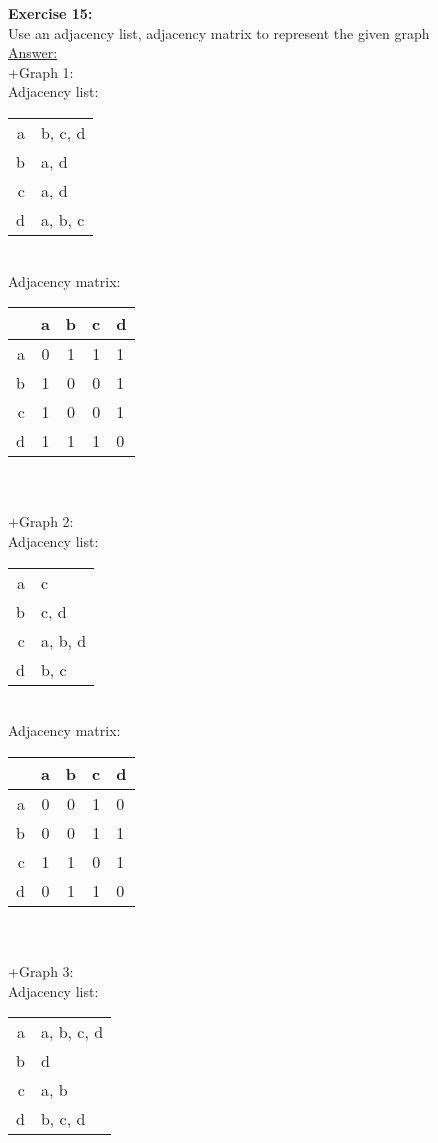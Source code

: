 \documentclass[10pt]{article}
\begin{document}
	\textbf{Exercise 15:}\\
Use an adjacency list, adjacency matrix to represent the given graph\\
\underline{Answer:}\\
+Graph 1:\\
Adjacency list:\\
\begin{tabular}{r|l}
a & b, c, d\\
b & a, d\\
c & a, d\\
d & a, b, c\\
\end{tabular}\\
Adjacency matrix:\\
\begin{tabular}{|r|c|c|c|l|}
\hline
  &a & b& c& d\\
\hline
a&0 & 1&1&1\\
\hline
b &1 & 0& 0& 1\\
\hline
c &1 & 0& 0& 1\\
\hline
d &1 & 1& 1& 0\\
\hline
\end{tabular}\\
\\
+Graph 2:\\
Adjacency list:\\
\begin{tabular}{r|l}
a & c\\
b & c, d\\
c & a, b, d\\
d & b, c\\
\end{tabular}\\
Adjacency matrix:\\
\begin{tabular}{|r|c|c|c|l|}
\hline
  &a & b& c& d\\
\hline
a&0 & 0&1&0\\
\hline
b &0 & 0& 1& 1\\
\hline
c &1 & 1& 0& 1\\
\hline
d &0 & 1& 1& 0\\
\hline
\end{tabular}\\
\\
+Graph 3:\\
Adjacency list:\\
\begin{tabular}{r|l}
a & a, b, c, d\\
b & d\\
c & a, b\\
d & b, c, d\\
\end{tabular}\\
\end{document}
